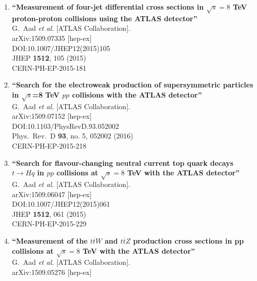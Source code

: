 \documentclass{article}
\begin{document}
\begin{enumerate}
\item%
{\bf ``Measurement of four-jet differential cross sections in $\sqrt{s}=8$ TeV proton-proton collisions using the ATLAS detector''}
  \\{}G.~Aad {\it et al.} [ATLAS Collaboration].
  \\{}arXiv:1509.07335 [hep-ex]
  \\{}DOI:10.1007/JHEP12(2015)105
  \\{}JHEP {\bf 1512}, 105 (2015)
  \\{}CERN-PH-EP-2015-181
\item%
{\bf ``Search for the electroweak production of supersymmetric particles in $\sqrt{s}$=8 TeV $pp$ collisions with the ATLAS detector''}
  \\{}G.~Aad {\it et al.} [ATLAS Collaboration].
  \\{}arXiv:1509.07152 [hep-ex]
  \\{}DOI:10.1103/PhysRevD.93.052002
  \\{}Phys.\ Rev.\ D {\bf 93}, no. 5, 052002 (2016)
  \\{}CERN-PH-EP-2015-218
\item%
{\bf ``Search for flavour-changing neutral current top quark decays $t\to Hq$ in $pp$ collisions at $\sqrt{s}=8$ TeV with the ATLAS detector''}
  \\{}G.~Aad {\it et al.} [ATLAS Collaboration].
  \\{}arXiv:1509.06047 [hep-ex]
  \\{}DOI:10.1007/JHEP12(2015)061
  \\{}JHEP {\bf 1512}, 061 (2015)
  \\{}CERN-PH-EP-2015-229
\item%
{\bf ``Measurement of the $ t\overline{t}W $ and $ t\overline{t}Z $ production cross sections in pp collisions at $ \sqrt{s}=8 $ TeV with the ATLAS detector''}
  \\{}G.~Aad {\it et al.} [ATLAS Collaboration].
  \\{}arXiv:1509.05276 [hep-ex]

\end{enumerate}
\end{document}
